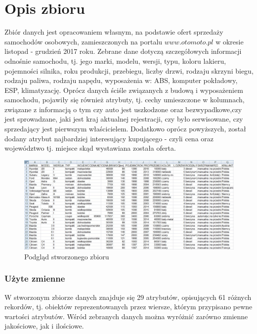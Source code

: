 \documentclass[12pt,a4paper]{report}
\begin{document}
\section{Opis zbioru}
\noindent
Zbiór danych jest opracowaniem własnym, na podstawie ofert sprzedaży samochodów osobowych, zamieszczonych na portalu $www.otomoto.pl$ w okresie listopad - grudzień 2017 roku. Zebrane dane dotyczą szczegółowych informacji odnośnie samochodu, tj. jego marki, modelu, wersji, typu, koloru lakieru, pojemności silnika, roku produkcji, przebiegu, liczby drzwi, rodzaju skrzyni biegu, rodzaju paliwa, rodzaju napędu, wyposażenia w: ABS, komputer pokładowy, ESP, klimatyzację. Oprócz danych ściśle związanych z budową i wyposażeniem samochodu, pojawiły się również atrybuty, tj. cechy umieszczone w kolumnach, związane z informacją o tym czy auto jest uszkodzone oraz bezwypadkowe,czy jest sprowadzane, jaki jest kraj aktualnej rejestracji, czy było serwisowane, czy sprzedający jest pierwszym właścicielem. Dodatkowo oprócz powyższych, został dodany atrybut najbardziej interesujący kupującego - czyli cena oraz województwo tj. miejsce skąd wystawiana została oferta.
\begin{figure}[h]
\centering
\includegraphics[width=1\textwidth]{img/zbior3.jpg}
\caption{Podgląd stworzonego zbioru}
\label{fig:obrazek1}
\end{figure}


\subsubsection{Użyte zmienne}
\noindent

W stworzonym zbiorze danych znajduje się 29 atrybutów, opisujących 61 różnych rekordów, tj. obiektów reprezentowanych przez wiersze, którym przypisano pewne wartości atrybutów. Wśród zebranych danych można wyróżnić zarówno zmienne jakościowe, jak i ilościowe. 
\end{document}
